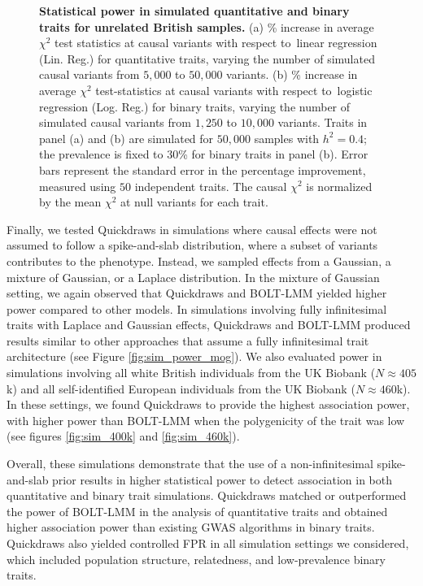 \begin{figure}[h!]
    \caption{\textbf{Statistical power in simulated quantitative and binary traits for unrelated British samples.}
    (a) \% increase in average $\chi^2$ test statistics at causal variants with respect to\ linear regression (Lin. Reg.) for quantitative traits, varying the number of simulated causal variants from $5{,}000$ to $50{,}000$ variants.
    (b) \% increase in average $\chi^2$ test-statistics at causal variants with respect to\ logistic regression (Log. Reg.) for binary traits, varying the number of simulated causal variants from $1{,}250$ to $10{,}000$ variants.
    Traits in panel (a) and (b) are simulated for $50{,}000$ samples with $h^2 = 0.4$; the prevalence is fixed to $30$\% for binary traits in panel (b).
    Error bars represent the standard error in the percentage improvement, measured using $50$ independent traits.
    The causal $\chi^2$ is normalized by the mean $\chi^2$ at null variants for each trait.
    } 
    \label{fig:sim_power}
\end{figure}

%
Finally, we tested Quickdraws in simulations where causal effects were not assumed to follow a spike-and-slab distribution, where a subset of variants contributes to the phenotype.
%
Instead, we sampled effects from a Gaussian, a mixture of Gaussian, or a Laplace distribution.
%
In the mixture of Gaussian setting, we again observed that Quickdraws and BOLT-LMM yielded higher power compared to other models.
%
In simulations involving fully infinitesimal traits with Laplace and Gaussian effects, Quickdraws and BOLT-LMM produced results similar to other approaches that assume a fully infinitesimal trait architecture (see Figure \ref{fig:sim_power_mog}).
%
We also evaluated power in simulations involving all white British individuals from the UK Biobank ($N \approx 405$k) and all self-identified European individuals from the UK Biobank ($N \approx 460$k).
%
In these settings, we found Quickdraws to provide the highest association power, with higher power than BOLT-LMM when the polygenicity of the trait was low (see figures \ref{fig:sim_400k} and \ref{fig:sim_460k}).
%
%



Overall, these simulations demonstrate that the use of a non-infinitesimal spike-and-slab prior results in higher statistical power to detect association in both quantitative and binary trait simulations.
%
Quickdraws matched or outperformed the power of BOLT-LMM in the analysis of quantitative traits and obtained higher association power than existing GWAS algorithms in binary traits.
%
Quickdraws also yielded controlled FPR in all simulation settings we considered, which included population structure, relatedness, and low-prevalence binary traits.

